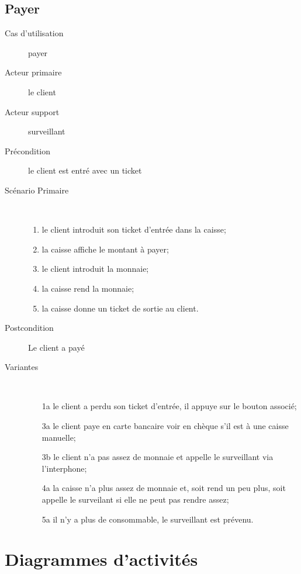 \documentclass[a4paper]{article}
\begin{document}
\subsection{Payer}
\begin{description}
	\item[Cas d'utilisation] payer
	\item[Acteur primaire] le client
	\item[Acteur support] surveillant
	\item[Pr\'econdition] le client est entr\'e avec un ticket
	\item[Sc\'enario Primaire] \
	\begin{enumerate}
		\item le client introduit son ticket d'entr\'ee dans la caisse;
		\item la caisse affiche le montant \`a payer;
		\item le client introduit la monnaie;
		\item la caisse rend la monnaie;
		\item la caisse donne un ticket de sortie au client.
	\end{enumerate}
	\item[Postcondition] Le client a pay\'e
	\item[Variantes] \
	\begin{enumerate}
		\item[1a] le client a perdu son ticket d'entr\'ee, il appuye sur le
			bouton associ\'e;
		\item[3a] le client paye en carte bancaire voir en ch\`eque s'il est
			\`a une caisse manuelle;
		\item[3b] le client n'a pas assez de monnaie et appelle le surveillant
			via l'interphone;
		\item[4a] la caisse n'a plus assez de monnaie et, soit rend un peu plus, soit
			appelle le surveilant si elle ne peut pas rendre assez;
		\item[5a] il n'y a plus de consommable, le surveillant est pr\'evenu.
	\end{enumerate}
\end{description}

\section{Diagrammes d'activit\'es}
\end{document}

